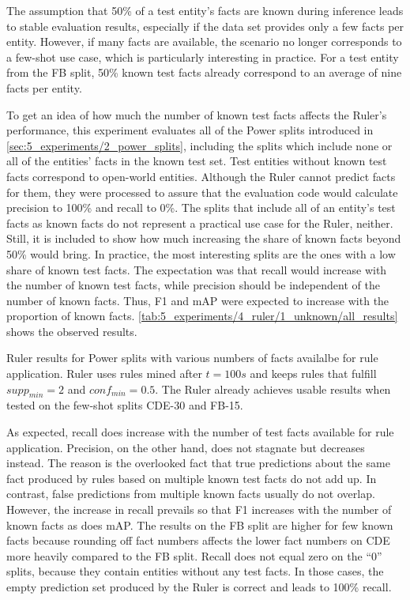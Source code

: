 The assumption that 50\% of a test entity's facts are known during inference leads to stable evaluation results, especially if the data set provides only a few facts per entity. However, if many facts are available, the scenario no longer corresponds to a few-shot use case, which is particularly interesting in practice. For a test entity from the FB split, 50\% known test facts already correspond to an average of nine facts per entity.

To get an idea of how much the number of known test facts affects the Ruler's performance, this experiment evaluates all of the Power splits introduced in \autoref{sec:5_experiments/2_power_splits}, including the splits which include none or all of the entities' facts in the known test set. Test entities without known test facts correspond to open-world entities. Although the Ruler cannot predict facts for them, they were processed to assure that the evaluation code would calculate precision to 100\% and recall to 0\%. The splits that include all of an entity's test facts as known facts do not represent a practical use case for the Ruler, neither. Still, it is included to show how much increasing the share of known facts beyond 50\% would bring. In practice, the most interesting splits are the ones with a low share of known test facts. The expectation was that recall would increase with the number of known test facts, while precision should be independent of the number of known facts. Thus, F1 and mAP were expected to increase with the proportion of known facts. \autoref{tab:5_experiments/4_ruler/1_unknown/all_results} shows the observed results.

\begin{table}
    \makebox[\textwidth][c]{
        
    }
    \caption{Ruler results for Power splits with various numbers of facts availalbe for rule application. Ruler uses rules mined after $t = 100s$ and keeps rules that fulfill $supp_{min} = 2$ and $conf_{min} = 0.5$. The Ruler already achieves usable results when tested on the few-shot splits CDE-30 and FB-15.}
    \label{tab:5_experiments/4_ruler/1_unknown/all_results}
\end{table}

As expected, recall does increase with the number of test facts available for rule application. Precision, on the other hand, does not stagnate but decreases instead. The reason is the overlooked fact that true predictions about the same fact produced by rules based on multiple known test facts do not add up. In contrast, false predictions from multiple known facts usually do not overlap. However, the increase in recall prevails so that F1 increases with the number of known facts as does mAP. The results on the FB split are higher for few known facts because rounding off fact numbers affects the lower fact numbers on CDE more heavily compared to the FB split. Recall does not equal zero on the ``0'' splits, because they contain entities without any test facts. In those cases, the empty prediction set produced by the Ruler is correct and leads to 100\% recall.
